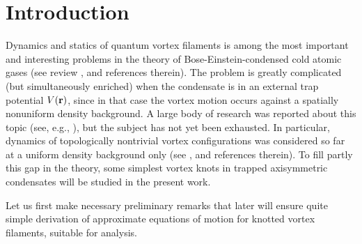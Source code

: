 \documentclass[pra,twocolumn,showpacs]{revtex4}
\begin{document}
\section{Introduction}

Dynamics and statics of quantum vortex filaments is among the most important and interesting problems 
in the theory of Bose-Einstein-condensed cold atomic gases  (see review \cite{F2009}, and references therein). 
The problem is greatly complicated (but simultaneously enriched) when the condensate is in an external 
trap potential $V({\bf r})$, since in that case the vortex motion occurs against a spatially nonuniform
density background. A large body of research was reported about this topic (see, e.g., 
\cite{SF2000,FS2001,R2001,AR2001,GP2001,A2002,AR2002,RBD2002,AD2003,AD2004,SR2004,D2005,
Kelvin_vaves,ring_istability,v-2015,reconn-2017,top-2017}), but the subject has not yet been exhausted.
In particular, dynamics of topologically nontrivial vortex configurations was considered so far
at a uniform density background only (see \cite{RSB999,MABR2010,POB2012,KI2013,POB2014,LMB016,KKI2016}, 
and references therein). To fill partly this gap in the theory, some simplest vortex knots in trapped 
axisymmetric condensates will be studied in the present work.

Let us first make necessary preliminary remarks that later will ensure quite simple derivation of 
approximate equations of motion for knotted vortex filaments, suitable for analysis.
\end{document}
